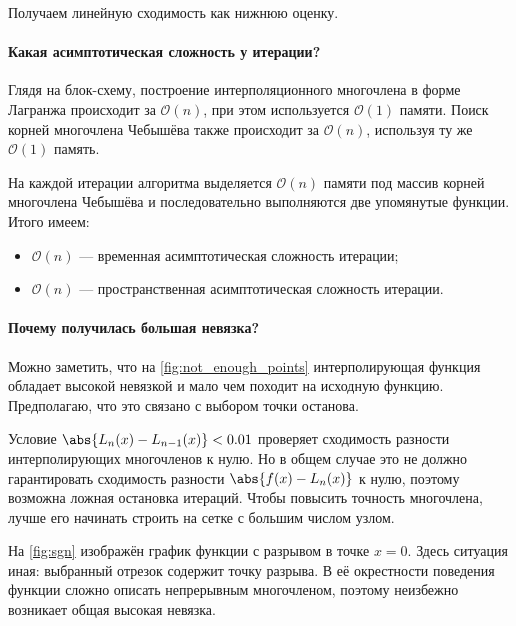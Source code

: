 Получаем линейную сходимость как нижнюю оценку.

\paragraph{Какая асимптотическая сложность у итерации?}

Глядя на блок-схему, построение интерполяционного многочлена в форме Лагранжа происходит за \( \mathcal{O}(n) \), при этом используется \( \mathcal{O}(1) \) памяти. Поиск корней многочлена Чебышёва также происходит за \( \mathcal{O}(n) \), используя ту же \( \mathcal{O}(1) \) память. 

На каждой итерации алгоритма выделяется \( \mathcal{O}(n) \) памяти под массив корней многочлена Чебышёва и последовательно выполняются две упомянутые функции. Итого имеем:
\begin{itemize}
  \item \( \mathcal{O}(n) \) --- временная асимптотическая сложность итерации;
  \item \( \mathcal{O}(n) \) --- пространственная асимптотическая сложность итерации.
\end{itemize}

\paragraph{Почему получилась большая невязка?} Можно заметить, что на \autoref{fig:not_enough_points} интерполирующая функция обладает высокой невязкой и мало чем походит на исходную функцию. Предполагаю, что это связано с выбором точки останова.

Условие \( \abs{L_n(x)-L_{n-1}(x)}< 0.01 \) проверяет сходимость разности интерполирующих многочленов к нулю. Но в общем случае это не должно гарантировать сходимость разности \( \abs{f(x)-L_n(x)} \) к нулю, поэтому возможна ложная остановка итераций. Чтобы повысить точность многочлена, лучше его начинать строить на сетке с большим числом узлом.

На \autoref{fig:sgn} изображён график функции с разрывом в точке \( x=0 \). Здесь ситуация иная: выбранный отрезок содержит точку разрыва. В её окрестности поведения функции сложно описать непрерывным многочленом, поэтому неизбежно возникает общая высокая невязка.